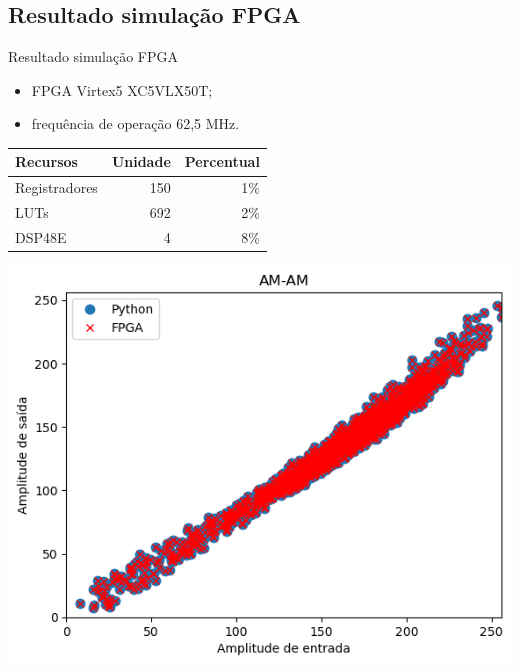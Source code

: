 \documentclass{if-beamer}
\begin{document}
\subsection{Resultado simulação FPGA}
\begin{frame}{Resultado simulação FPGA}
	\begin{minipage}{0.5\textwidth}
	\begin{itemize}
		\item FPGA Virtex5 XC5VLX50T;
		\item frequência de operação 62,5 MHz.
	\end{itemize}
	\begin{tabular}{|l|r|r|}
		\hline
		Recursos & Unidade & Percentual \\
		\hline
		Registradores & 150 & 1\% \\
		LUTs & 692 & 2\% \\
		DSP48E & 4 & 8\% \\
		\hline
	\end{tabular}
	
	
\end{minipage}%
\hspace{0.04\textwidth}
\begin{minipage}{0.5\textwidth}
	\includegraphics[scale=0.40]{fpgasim.png}
\end{minipage}
\end{frame}
\end{document}
